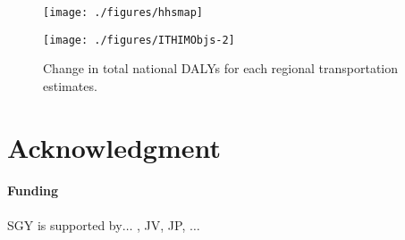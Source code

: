 \documentclass{bioinfo}
\begin{document}
\begin{figure}[t]
    \centerline{\texttt{[image: ./figures/hhsmap]}}\centerline{\texttt{[image: ./figures/ITHIMObjs-2]}}
    \caption{Change in total national DALYs for each regional transportation
estimates.
}\label{dalyFigure}
\end{figure}

\section*{Acknowledgment}

\paragraph{Funding\textcolon} SGY is supported by$\ldots$ , JV, JP, $\ldots$

%
%


\end{document}
